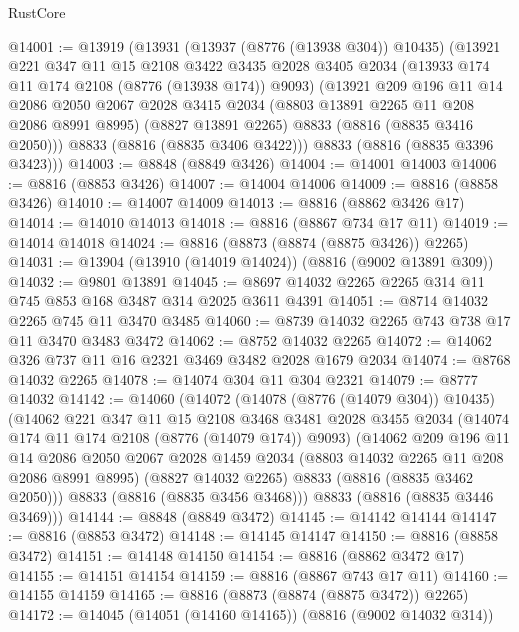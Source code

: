 \begin{lexlean}{RustCore}
\begin{coremodule}
@14001 := @13919
    (@13931
      (@13937 (@8776 (@13938 @304)) @10435)
      (@13921
        @221
        @347
        @11
        @15
        @2108
        @3422
        @3435
        @2028
        @3405
        @2034
        (@13933 @174 @11 @174 @2108 (@8776 (@13938 @174)) @9093)
        (@13921
          @209
          @196
          @11
          @14
          @2086
          @2050
          @2067
          @2028
          @3415
          @2034
          (@8803 @13891 @2265 @11 @208 @2086 @8991 @8995)
          (@8827 @13891 @2265)
          @8833
          (@8816 (@8835 @3416 @2050)))
        @8833
        (@8816 (@8835 @3406 @3422)))
      @8833
      (@8816 (@8835 @3396 @3423)))
@14003 := @8848 (@8849 @3426)
@14004 := @14001 @14003
@14006 := @8816 (@8853 @3426)
@14007 := @14004 @14006
@14009 := @8816 (@8858 @3426)
@14010 := @14007 @14009
@14013 := @8816 (@8862 @3426 @17)
@14014 := @14010 @14013
@14018 := @8816 (@8867 @734 @17 @11)
@14019 := @14014 @14018
@14024 := @8816 (@8873 (@8874 (@8875 @3426)) @2265)
@14031 := @13904 (@13910 (@14019 @14024)) (@8816 (@9002 @13891 @309))
@14032 := @9801 @13891
@14045 := @8697 @14032 @2265 @2265 @314 @11 @745 @853 @168 @3487 @314 @2025 @3611 @4391
@14051 := @8714 @14032 @2265 @745 @11 @3470 @3485
@14060 := @8739 @14032 @2265 @743 @738 @17 @11 @3470 @3483 @3472
@14062 := @8752 @14032 @2265
@14072 := @14062 @326 @737 @11 @16 @2321 @3469 @3482 @2028 @1679 @2034
@14074 := @8768 @14032 @2265
@14078 := @14074 @304 @11 @304 @2321
@14079 := @8777 @14032
@14142 := @14060
    (@14072
      (@14078 (@8776 (@14079 @304)) @10435)
      (@14062
        @221
        @347
        @11
        @15
        @2108
        @3468
        @3481
        @2028
        @3455
        @2034
        (@14074 @174 @11 @174 @2108 (@8776 (@14079 @174)) @9093)
        (@14062
          @209
          @196
          @11
          @14
          @2086
          @2050
          @2067
          @2028
          @1459
          @2034
          (@8803 @14032 @2265 @11 @208 @2086 @8991 @8995)
          (@8827 @14032 @2265)
          @8833
          (@8816 (@8835 @3462 @2050)))
        @8833
        (@8816 (@8835 @3456 @3468)))
      @8833
      (@8816 (@8835 @3446 @3469)))
@14144 := @8848 (@8849 @3472)
@14145 := @14142 @14144
@14147 := @8816 (@8853 @3472)
@14148 := @14145 @14147
@14150 := @8816 (@8858 @3472)
@14151 := @14148 @14150
@14154 := @8816 (@8862 @3472 @17)
@14155 := @14151 @14154
@14159 := @8816 (@8867 @743 @17 @11)
@14160 := @14155 @14159
@14165 := @8816 (@8873 (@8874 (@8875 @3472)) @2265)
@14172 := @14045 (@14051 (@14160 @14165)) (@8816 (@9002 @14032 @314))

\end{coremodule}
\end{lexlean}
